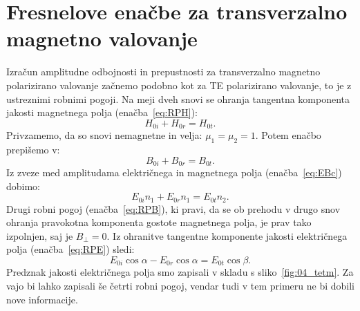 \section{Fresnelove enačbe za transverzalno magnetno valovanje}
Izračun amplitudne odbojnosti in prepustnosti za
transverzalno magnetno polarizirano valovanje začnemo podobno kot za 
TE polarizirano valovanje, to je z ustreznimi robnimi pogoji. 
Na meji dveh snovi se ohranja tangentna 
komponenta jakosti magnetnega polja (enačba~\ref{eq:RPH}):
\begin{equation}
H_{0i} + H_{0r}= H_{0t}.
\label{eq:04_29}
\end{equation}
Privzamemo, da so snovi nemagnetne in velja: $\mu_1 = \mu_2 = 1$. Potem enačbo
prepišemo v:
\begin{equation}
B_{0i} + B_{0r}= B_{0t}.
\label{eq:04_30}
\end{equation}
Iz zveze med amplitudama električnega in magnetnega polja (enačba~\ref{eq:EBc})
dobimo:
\begin{equation}
E_{0i}n_1 + E_{0r}n_1= E_{0t}n_2.
\label{eq:04_31}
\end{equation}
Drugi robni pogoj (enačba~\ref{eq:RPB}), ki pravi, da se ob prehodu v drugo snov ohranja
pravokotna komponenta gostote magnetnega polja, je prav tako izpolnjen, saj je $B_{\perp}=0$. 
Iz ohranitve tangentne komponente jakosti
električnega polja (enačba~\ref{eq:RPE}) sledi:
\begin{equation}
E_{0i} \cos \alpha - E_{0r}\cos \alpha = E_{0t}\cos \beta.
\label{eq:04_32}
\end{equation}
Predznak jakosti električnega polja smo zapisali v skladu s sliko~\ref{fig:04_tetm}. 
Za vajo bi lahko zapisali še četrti robni pogoj, vendar tudi v tem primeru ne bi dobili nove informacije.

